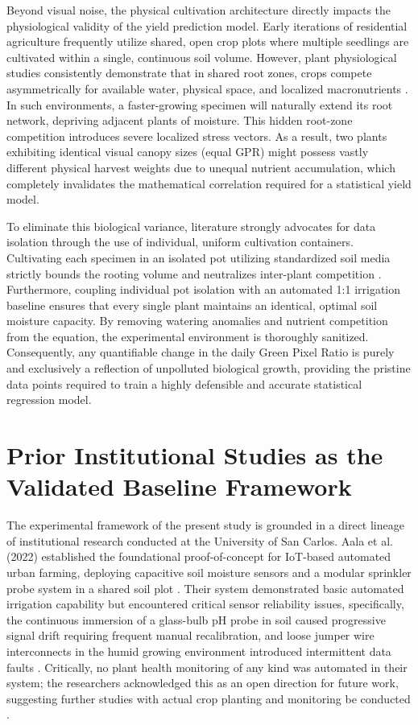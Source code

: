 Beyond visual noise, the physical cultivation architecture directly impacts the physiological validity of the yield prediction model. Early iterations of residential agriculture frequently utilize shared, open crop plots where multiple seedlings are cultivated within a single, continuous soil volume. However, plant physiological studies consistently demonstrate that in shared root zones, crops compete asymmetrically for available water, physical space, and localized macronutrients \cite{Poorter2012}. In such environments, a faster-growing specimen will naturally extend its root network, depriving adjacent plants of moisture. This hidden root-zone competition introduces severe localized stress vectors. As a result, two plants exhibiting identical visual canopy sizes (equal GPR) might possess vastly different physical harvest weights due to unequal nutrient accumulation, which completely invalidates the mathematical correlation required for a statistical yield model.

To eliminate this biological variance, literature strongly advocates for data isolation through the use of individual, uniform cultivation containers. Cultivating each specimen in an isolated pot utilizing standardized soil media strictly bounds the rooting volume and neutralizes inter-plant competition \cite{Poorter2012}. Furthermore, coupling individual pot isolation with an automated 1:1 irrigation baseline ensures that every single plant maintains an identical, optimal soil moisture capacity. By removing watering anomalies and nutrient competition from the equation, the experimental environment is thoroughly sanitized. Consequently, any quantifiable change in the daily Green Pixel Ratio is purely and exclusively a reflection of unpolluted biological growth, providing the pristine data points required to train a highly defensible and accurate statistical regression model.

\section{Prior Institutional Studies as the Validated Baseline Framework}

The experimental framework of the present study is grounded in a direct lineage of institutional research conducted at the University of San Carlos. Aala et al. (2022) established the foundational proof-of-concept for IoT-based automated urban farming, deploying capacitive soil moisture sensors and a modular sprinkler probe system in a shared soil plot \cite{Aala2022}. Their system demonstrated basic automated irrigation capability but encountered critical sensor reliability issues, specifically, the continuous immersion of a glass-bulb pH probe in soil caused progressive signal drift requiring frequent manual recalibration, and loose jumper wire interconnects in the humid growing environment introduced intermittent data faults \cite{Aala2022}. Critically, no plant health monitoring of any kind was automated in their system; the researchers acknowledged this as an open direction for future work, suggesting further studies with actual crop planting and monitoring be conducted \cite{Aala2022}.

